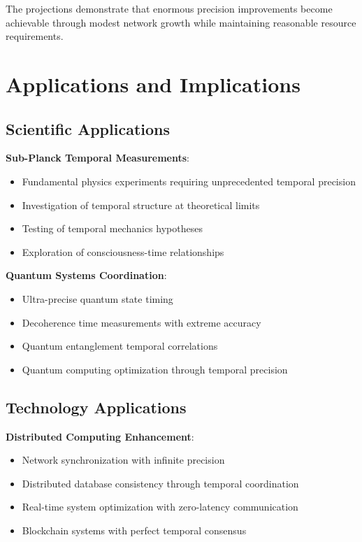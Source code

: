 \documentclass[12pt,a4paper]{article}
\begin{document}
The projections demonstrate that enormous precision improvements become achievable through modest network growth while maintaining reasonable resource requirements.

\section{Applications and Implications}

\subsection{Scientific Applications}

\textbf{Sub-Planck Temporal Measurements}:
\begin{itemize}
\item Fundamental physics experiments requiring unprecedented temporal precision
\item Investigation of temporal structure at theoretical limits
\item Testing of temporal mechanics hypotheses
\item Exploration of consciousness-time relationships
\end{itemize}

\textbf{Quantum Systems Coordination}:
\begin{itemize}
\item Ultra-precise quantum state timing
\item Decoherence time measurements with extreme accuracy
\item Quantum entanglement temporal correlations
\item Quantum computing optimization through temporal precision
\end{itemize}

\subsection{Technology Applications}

\textbf{Distributed Computing Enhancement}:
\begin{itemize}
\item Network synchronization with infinite precision
\item Distributed database consistency through temporal coordination
\item Real-time system optimization with zero-latency communication
\item Blockchain systems with perfect temporal consensus
\end{itemize}
\end{document}
